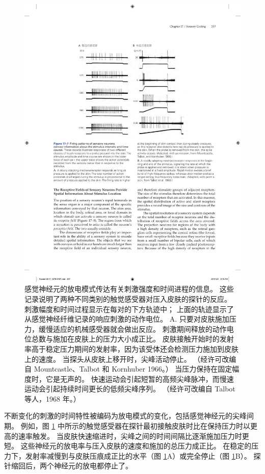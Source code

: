 \begin{figure}[htbp]
	\centering
	\includegraphics[width=1.0\linewidth]{chap17/fig_17_7}
	\caption{感觉神经元的放电模式传达有关刺激强度和时间进程的信息。
		这些记录说明了两种不同类别的触觉感受器对压入皮肤的探针的反应。 
		刺激幅度和时间过程显示在每对的下方轨迹中； 
		上面的轨迹显示了从感觉神经纤维记录的响应刺激的动作电位。 
		A. 只要对皮肤施加压力，缓慢适应的机械感受器就会做出反应。 
		刺激期间释放的动作电位总数与施加在皮肤上的压力大小成正比。 
		皮肤接触开始时的发射率高于稳定压力期间的发射率，因为该受体还会检测压力施加到皮肤上的速度。 
		当探头从皮肤上移开时，尖峰活动停止。 （经许可改编自 Mountcastle、Talbot 和 Kornhuber 1966。） 当压力保持在固定幅度时，它是无声的。 
		快速运动会引起短暂的高频尖峰脉冲，而慢速运动会引起持续时间更长的低频尖峰序列。 （经许可改编自 Talbot 等人，1968 年。）}
	\label{fig:17_7}
\end{figure}

不断变化的刺激的时间特性被编码为放电模式的变化，包括感觉神经元的尖峰间期。 
例如，图 \ref{fig:17_7} 中所示的触觉感受器在探针最初接触皮肤时比在保持压力时以更高的速率触发。 
当皮肤快速缩进时，尖峰之间的时间间隔比逐渐施加压力时更短。 
这些神经元的放电率与压入皮肤的速度和施加的总压力成正比。 
在稳定的压力下，发射率减慢到与皮肤压痕成正比的水平（图 \ref{fig:17_7}A）或完全停止（图 \ref{fig:17_7}B）。 
探针缩回后，两个神经元的放电都停止了。


